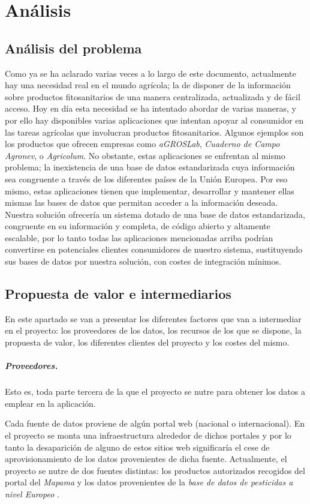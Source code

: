 \chapter{Análisis} \label{analisis}
\section{Análisis del problema} \label{analisis.problema}
Como ya se ha aclarado varias veces a lo largo de este documento, actualmente hay una necesidad real en el mundo agrícola; la de disponer de la información sobre productos fitosanitarios de una manera centralizada, actualizada y de fácil acceso. Hoy en día esta necesidad se ha intentado abordar de varias maneras, y por ello hay disponibles varias aplicaciones que intentan apoyar al consumidor en las tareas agrícolas que involucran productos fitosanitarios. Algunos ejemplos son los productos que ofrecen empresas como \textit{aGROSLab}, \textit{Cuaderno de Campo Agronev}, o \textit{Agricolum}. No obstante, estas aplicaciones se enfrentan al mismo problema; la inexistencia de una base de datos estandarizada cuya información sea congruente a través de los diferentes países de la Unión Europea. Por eso mismo, estas aplicaciones tienen que implementar, desarrollar y mantener ellas mismas las bases de datos que permitan acceder a la información deseada. Nuestra solución ofrecería un sistema dotado de una base de datos estandarizada, congruente en su información y completa, de código abierto y altamente escalable, por lo tanto todas las aplicaciones mencionadas arriba podrían convertirse en potenciales clientes consumidores de nuestro sistema, sustituyendo sus bases de datos por nuestra solución, con costes de integración mínimos.

\section{Propuesta de valor e intermediarios} \label{analisis.marco}
En este apartado se van a presentar los diferentes factores que van a intermediar en el proyecto: los proveedores de los datos, los recursos de los que se dispone, la propuesta de valor, los diferentes clientes del proyecto y los costes del mismo. 
\paragraph*{Proveedores.} Esto es, toda parte tercera de la que el proyecto se nutre para obtener los datos a emplear en la aplicación. \par Cada fuente de datos proviene de algún portal web (nacional o internacional). En el proyecto se monta una infraestructura alrededor de dichos portales y por lo tanto la desaparición de alguno de estos sitios web significaría el cese de aprovisionamiento de los datos provenientes de dicha fuente. Actualmente, el proyecto se nutre de dos fuentes distintas: los productos autorizados recogidos del portal del \textit{Mapama} \cite{mapama} y los datos provenientes de la \textit{base de datos de pesticidas a nivel Europeo} \cite{pesticidesdb}.
